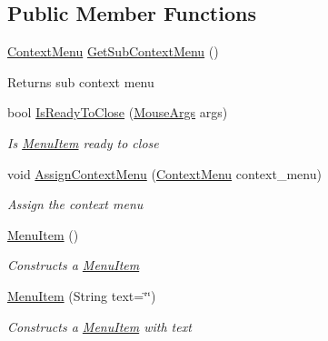 \subsection*{Public Member Functions}
\begin{DoxyCompactItemize}
\item 
\mbox{\label{class_space_v_i_l_1_1_menu_item_a4147be20a79641bd3c1e97e87af7b0bc}} 
\mbox{\hyperlink{class_space_v_i_l_1_1_context_menu}{Context\+Menu}} \mbox{\hyperlink{class_space_v_i_l_1_1_menu_item_a4147be20a79641bd3c1e97e87af7b0bc}{Get\+Sub\+Context\+Menu}} ()
\begin{DoxyCompactList}\small\item\em \begin{DoxyReturn}{Returns}
sub context menu 
\end{DoxyReturn}
\end{DoxyCompactList}\item 
bool \mbox{\hyperlink{class_space_v_i_l_1_1_menu_item_abf80ecab40a7c3d6bc655a70231ec5da}{Is\+Ready\+To\+Close}} (\mbox{\hyperlink{class_space_v_i_l_1_1_core_1_1_mouse_args}{Mouse\+Args}} args)
\begin{DoxyCompactList}\small\item\em Is \mbox{\hyperlink{class_space_v_i_l_1_1_menu_item}{Menu\+Item}} ready to close \end{DoxyCompactList}\item 
void \mbox{\hyperlink{class_space_v_i_l_1_1_menu_item_a1525b3cbf3eda9f35e9ad993326512be}{Assign\+Context\+Menu}} (\mbox{\hyperlink{class_space_v_i_l_1_1_context_menu}{Context\+Menu}} context\+\_\+menu)
\begin{DoxyCompactList}\small\item\em Assign the context menu \end{DoxyCompactList}\item 
\mbox{\hyperlink{class_space_v_i_l_1_1_menu_item_ac63df35b47cb47c446208e9024d070c8}{Menu\+Item}} ()
\begin{DoxyCompactList}\small\item\em Constructs a \mbox{\hyperlink{class_space_v_i_l_1_1_menu_item}{Menu\+Item}} \end{DoxyCompactList}\item 
\mbox{\hyperlink{class_space_v_i_l_1_1_menu_item_ade5f55fe599f1b5c2d57728f815f4ca5}{Menu\+Item}} (String text=\char`\"{}\char`\"{})
\begin{DoxyCompactList}\small\item\em Constructs a \mbox{\hyperlink{class_space_v_i_l_1_1_menu_item}{Menu\+Item}} with text \end{DoxyCompactList}\item 

\end{DoxyCompactItemize}
